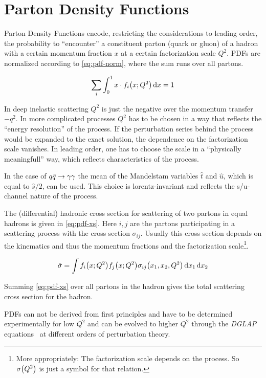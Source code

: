 \section{Parton Density Functions}%
\label{sec:pdf_basics}

Parton Density Functions encode, restricting the considerations to
leading order, the probability to ``encounter'' a constituent parton
(quark or gluon) of a hadron with a certain momentum fraction \(x\) at
a certain factorization scale \(Q^2\). PDFs are normalized according
to \cref{eq:pdf-norm}, where the sum runs over all partons.

\begin{equation}
  \label{eq:pdf-norm}
  \sum_i\int_0^1x\cdot f_i\qty(x;Q^2) \dd{x} = 1
\end{equation}

In deep inelastic scattering \(Q^2\) is just the negative over the
momentum transfer \(-q^2\). In more complicated processes \(Q^2\) has
to be chosen in a way that reflects the ``energy resolution'' of the
process. If the perturbation series behind the process would be
expanded to the exact solution, the dependence on the factorization
scale vanishes. In leading order, one has to choose the scale in a
``physically meaningfull'' way, which reflects characteristics of the
process.

In the case of \(q\bar{q}\rightarrow\gamma\gamma\) the mean of the Mandelstam variables \(\hat{t}\)
and \(\hat{u}\), which is equal to \(\hat{s}/2\), can be used. This
choice is lorentz-invariant and reflects the s/u-channel nature of the
process.

The (differential) hadronic cross section for scattering of two
partons in equal hadrons is given in \cref{eq:pdf-xs}. Here \(i,j\) are
the partons participating in a scattering process with the cross
section \(\sigma_{ij}\). Usually this cross section depends on the
kinematics and thus the momentum fractions and the factorization
scale\footnote{More appropriately: The factorization scale depends on
  the process. So \(\sigma\qty(Q^2)\) is just a symbol for that
  relation.}.

\begin{equation}
  \label{eq:pdf-xs}
  \tilde{\sigma} = \int f_i\qty(x;Q^2) f_j\qty(x;Q^2) \sigma_{ij}\qty(x_1,
  x_2, Q^2)\dd{x_1}\dd{x_2}
\end{equation}

Summing \cref{eq:pdf-xs} over all partons in the hadron gives
the total scattering cross section for the hadron.

PDFs can not be derived from first principles and have to be
determined experimentally for low \(Q^2\) and can be evolved to higher
\(Q^2\) through the \emph{DGLAP} equations~\cite{altarelli:1977af} at
different orders of perturbation theory.


